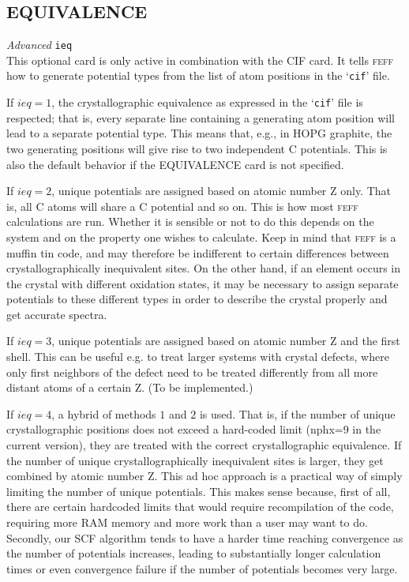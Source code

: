 \documentclass[11pt,oneside]{report} %
\renewcommand{\htmlref}[2]{\hyperlink{#2}{#1}}
\newcommand{\program}[1]{\textsc{#1}}
\newcommand{\feff}{\program{feff}}
\newenvironment{Card}[4]%
      {\vspace{3ex}%
        \subsection{#1}
        \quad\textsl{#3}\newline
        \quad\texttt{#2}\newline%
        \label{card:#4}\\}
      {}
\newcommand{\file}[1]{`\texttt{#1}'}
\renewcommand{\htmlref}[2]{{#1}} %
\begin{document}
\begin{Card}{EQUIVALENCE}{ieq}{Advanced}{equ}
This optional card is only active in combination with the \htmlref{CIF}{card:cif} card.  It tells {\feff} how to generate
potential types from the list of atom positions in the \file{cif} file. 

If $ieq=1$, the crystallographic equivalence as expressed
in the \file{cif} file is respected; that is, every separate line containing a generating atom position will lead to a separate potential type.
This means that, e.g., in HOPG graphite, the two generating positions will give rise to two independent C potentials.  This is also the default behavior
if the EQUIVALENCE card is not specified.

If $ieq=2$, unique potentials are assigned based on atomic number Z only.  That is, all C atoms will share a C potential and so on.  This is how most {\feff} calculations
are run.  Whether it is sensible or not to do this depends on the system and on the property one wishes to calculate.  Keep in mind that {\feff} is a muffin tin code, and may
therefore be indifferent to certain differences between crystallographically inequivalent sites.  On the other hand, if an element occurs in the crystal with different oxidation states,
it may be necessary to assign separate potentials to these different types in order to describe the crystal properly and get accurate spectra.

If $ieq=3$, unique potentials are assigned based on atomic number Z and the first shell.  This can be useful e.g. to treat larger systems with crystal defects, where only first neighbors of the
defect need to be treated differently from all more distant atoms of a certain Z.  (To be implemented.)

If $ieq=4$, a hybrid of methods $1$ and $2$ is used.  That is, if the number of unique crystallographic positions does not exceed a hard-coded limit (nphx=9 in the current version), they are treated
with the correct crystallographic equivalence.  If the number of unique crystallographically inequivalent sites is larger, they get combined by atomic number Z.  This ad hoc approach is a practical way of simply limiting 
the number of unique potentials.  This makes sense because, first of all, there are certain hardcoded limits that would require recompilation of the code, requiring more RAM memory and more work than a user may want to do.
Secondly, our SCF algorithm tends to have a harder time reaching convergence as the number of potentials increases, leading to substantially longer calculation times or even convergence failure if the number of potentials 
becomes very large.


\end{Card}
\end{document}
